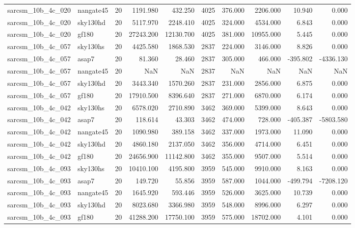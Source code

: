 \begin{longtable}{llrrrrrrrr}
sarcsm\_10b\_4c\_020 & nangate45 & 20 & 1191.980 & 432.250 & 4025 & 376.000 & 2206.000 & 10.940 & 0.000 \\
sarcsm\_10b\_4c\_020 & sky130hd & 20 & 5117.970 & 2248.410 & 4025 & 324.000 & 4534.000 & 6.843 & 0.000 \\
sarcsm\_10b\_4c\_020 & gf180 & 20 & 27243.200 & 12130.700 & 4025 & 381.000 & 10955.000 & 5.445 & 0.000 \\
sarcsm\_10b\_4c\_057 & sky130hs & 20 & 4425.580 & 1868.530 & 2837 & 224.000 & 3146.000 & 8.826 & 0.000 \\
sarcsm\_10b\_4c\_057 & asap7 & 20 & 81.360 & 28.460 & 2837 & 305.000 & 466.000 & -395.802 & -4336.130 \\
sarcsm\_10b\_4c\_057 & nangate45 & 20 & NaN & NaN & 2837 & NaN & NaN & NaN & NaN \\
sarcsm\_10b\_4c\_057 & sky130hd & 20 & 3443.340 & 1570.260 & 2837 & 231.000 & 2856.000 & 6.875 & 0.000 \\
sarcsm\_10b\_4c\_057 & gf180 & 20 & 17910.500 & 8396.640 & 2837 & 271.000 & 6870.000 & 6.174 & 0.000 \\
sarcsm\_10b\_4c\_042 & sky130hs & 20 & 6578.020 & 2710.890 & 3462 & 369.000 & 5399.000 & 8.643 & 0.000 \\
sarcsm\_10b\_4c\_042 & asap7 & 20 & 118.614 & 43.303 & 3462 & 474.000 & 728.000 & -405.387 & -5803.580 \\
sarcsm\_10b\_4c\_042 & nangate45 & 20 & 1090.980 & 389.158 & 3462 & 337.000 & 1973.000 & 11.090 & 0.000 \\
sarcsm\_10b\_4c\_042 & sky130hd & 20 & 4860.180 & 2137.050 & 3462 & 356.000 & 4714.000 & 6.451 & 0.000 \\
sarcsm\_10b\_4c\_042 & gf180 & 20 & 24656.900 & 11142.800 & 3462 & 355.000 & 9507.000 & 5.514 & 0.000 \\
sarcsm\_10b\_4c\_093 & sky130hs & 20 & 10410.100 & 4195.800 & 3959 & 545.000 & 9910.000 & 8.163 & 0.000 \\
sarcsm\_10b\_4c\_093 & asap7 & 20 & 149.720 & 55.856 & 3959 & 587.000 & 1044.000 & -499.794 & -7208.120 \\
sarcsm\_10b\_4c\_093 & nangate45 & 20 & 1645.920 & 593.446 & 3959 & 526.000 & 3625.000 & 10.739 & 0.000 \\
sarcsm\_10b\_4c\_093 & sky130hd & 20 & 8023.680 & 3366.980 & 3959 & 548.000 & 8996.000 & 6.297 & 0.000 \\
sarcsm\_10b\_4c\_093 & gf180 & 20 & 41288.200 & 17750.100 & 3959 & 575.000 & 18702.000 & 4.101 & 0.000 \\

\end{longtable}
